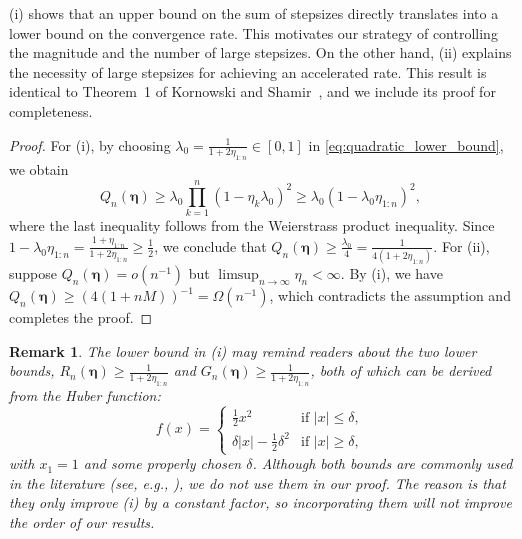 \documentclass[11pt]{article}
\newcommand{\abs}[1]{\left\lvert#1\right\rvert}
\newcommand{\schedule}{\bm{\eta}}
\newtheorem*{remark}{Remark}
\begin{document}
 (i) shows that an upper bound on the sum of stepsizes directly translates into a lower bound on the convergence rate.
This motivates our strategy of controlling the magnitude and the number of large stepsizes.
On the other hand,  (ii) explains the necessity of large stepsizes for achieving an accelerated rate.
This result is identical to Theorem~1 of Kornowski and Shamir~\cite{kornowski:2024}, and we include its proof for completeness.

\begin{proof}
For (i), by choosing $\lambda_0 = \frac{1}{1+2\eta_{1:n}}\in[0,1]$ in \eqref{eq:quadratic_lower_bound}, we obtain
\[
	Q_n(\schedule) \geq \lambda_0 \prod_{k=1}^n (1-\eta_k\lambda_0)^2
	\geq \lambda_0 \left( 1 - \lambda_0 \eta_{1:n} \right)^2,
\]
where the last inequality follows from the Weierstrass product inequality.
Since $1-\lambda_0\eta_{1:n} = \frac{1+\eta_{1:n}}{1+2\eta_{1:n}}\geq\frac{1}{2}$, we conclude that $Q_n(\schedule)\geq \frac{\lambda_0}{4} = \frac{1}{4(1+2\eta_{1:n})}$.
For (ii), suppose $Q_n(\schedule)=o(n^{-1})$ but $\limsup_{n\to\infty}\eta_n<\infty$.
By (i), we have $Q_n(\schedule) \geq (4(1+nM))^{-1} = \Omega(n^{-1})$, which contradicts the assumption and completes the proof.
\end{proof}


\begin{remark}
The lower bound in  (i) may remind readers about the two lower bounds, $R_n(\schedule)\geq\frac{1}{1+2\eta_{1:n}}$ and $G_n(\schedule)\geq\frac{1}{1+2\eta_{1:n}}$, both of which can be derived from the Huber function:
\begin{equation}\label{eq:huber}
	f(x) = \begin{cases}
		\frac{1}{2}x^2 &\text{if } \abs{x}\leq\delta, \\
		\delta\abs{x} - \frac{1}{2}\delta^2 &\text{if }\abs{x}\geq\delta,
	\end{cases}
\end{equation}
with $x_1=1$ and some properly chosen $\delta$.
Although both bounds are commonly used in the literature (see, e.g., \cite{drori:2014,grimmer:2025a,taylor:2017a}), we do not use them in our proof.
The reason is that they only improve   (i) by a constant factor, so incorporating them will not improve the order of our results.
\end{remark}
\end{document}
